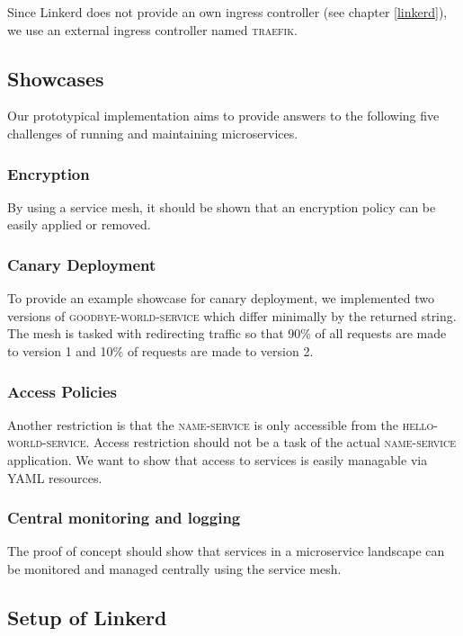 Since Linkerd does not provide an own ingress controller (see chapter \ref{linkerd}), we use an external ingress controller named \textsc{traefik}.

\subsection{Showcases}

Our prototypical implementation aims to provide answers to the following five challenges of running and maintaining microservices.

\subsubsection{Encryption}

By using a service mesh, it should be shown that an encryption policy can be easily applied or removed.

\subsubsection{Canary Deployment}

To provide an example showcase for canary deployment, we implemented two versions of \textsc{goodbye-world-service} which differ minimally by the returned string. The mesh is tasked with redirecting traffic so that 90\% of all requests are made to version 1 and 10\% of requests are made to version 2.

\subsubsection{Access Policies}

Another restriction is that the \textsc{name-service} is only accessible from the \textsc{hello-world-service}. Access restriction should not be a task of the actual \textsc{name-service} application. We want to show that access to services is easily managable via YAML resources.

\subsubsection{Central monitoring and logging}
The proof of concept should show that services in a microservice landscape can be monitored and managed centrally using the service mesh.

\subsection{Setup of Linkerd}

